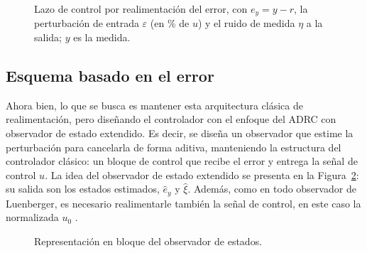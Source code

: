 \begin{figure}[H]
  \centering
  \caption[Lazo de control realimentado]{Lazo de control por realimentación del error, con
    $e_y = y - r$, la perturbación de entrada $\varepsilon$ (en \% de $u$) y el ruido de medida
    $\eta$ a la salida; $y$ es la medida.}
  \label{fig:feedbackBlock}
\end{figure}



\subsection{Esquema basado en el error}
\label{EsquemaError}

Ahora bien, lo que se busca es mantener esta arquitectura clásica de
realimentación, pero diseñando el controlador con el enfoque del ADRC con
observador de estado extendido. Es decir, se diseña un observador que estime la
perturbación para cancelarla de forma aditiva, manteniendo la estructura del
controlador clásico: un bloque de control que recibe el error y entrega la señal
de control $u$. La idea del observador de estado extendido se presenta en la
Figura~\ref{fig:observador}: su salida son los estados estimados, $\hat{e}_y$ y
$\hat{\xi}$. Además, como en todo observador de Luenberger, es necesario
realimentarle también la señal de control, en este caso la normalizada $u_0$
\cite{chen1993analog}.

\begin{figure}[H]
  \centering
  \caption{Representación en bloque del observador de estados.}
  \label{fig:observador}
\end{figure}



